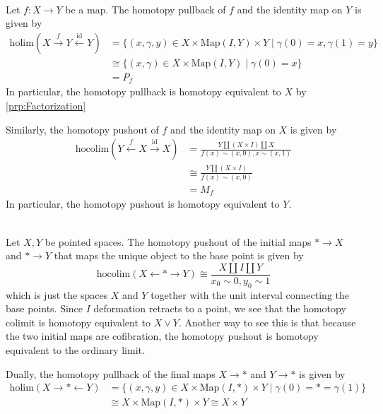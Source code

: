 \documentclass[a4paper]{article}
\begin{document}
\begin{eg}{}{}\\
Let $f:X\to Y$ be a map. The homotopy pullback of $f$ and the identity map on $Y$ is given by 
\begin{align*}
\text{holim}(X\overset{f}{\rightarrow}Y\overset{\text{id}}{\leftarrow}Y)&=\{(x,\gamma,y)\in X\times\text{Map}(I,Y)\times Y\;|\;\gamma(0)=x,\gamma(1)=y\}\\
&\cong\{(x,\gamma)\in X\times\text{Map}(I,Y)\;|\;\gamma(0)=x\}\\
&=P_f
\end{align*}
In particular, the homotopy pullback is homotopy equivalent to $X$ by \ref{prp:Factorization}

Similarly, the homotopy pushout of $f$ and the identity map on $X$ is given by \begin{align*}
\text{hocolim}(Y\overset{f}{\leftarrow}X\overset{\text{id}}{\rightarrow}X)&=\frac{Y\amalg(X\times I)\amalg X}{f(x)\sim(x,0), x\sim(x,1)}\\
&\cong\frac{Y\amalg(X\times I)}{f(x)\sim(x,0)}\\
&=M_f
\end{align*}
In particular, the homotopy pushout is homotopy equivalent to $Y$. 
\end{eg}

\begin{eg}{}{}\\
Let $X,Y$ be pointed spaces. The homotopy pushout of the initial maps $\ast\to X$ and $\ast\to Y$ that maps the unique object to the base point is given by $$\text{hocolim}(X\leftarrow\ast\rightarrow Y)\cong\frac{X\amalg I\amalg Y}{x_0\sim 0,y_0\sim 1}$$ which is just the spaces $X$ and $Y$ together with the unit interval connecting the base points. Since $I$ deformation retracts to a point, we see that the homotopy colimit is homotopy equivalent to $X\vee Y$. Another way to see this is that because the two initial maps are cofibration, the homotopy pushout is homotopy equivalent to the ordinary limit.  

Dually, the homotopy pullback of the final maps $X\to\ast$ and $Y\to\ast$ is given by 
\begin{align*}
\text{holim}(X\rightarrow\ast\leftarrow Y)&=\{(x,\gamma,y)\in X\times\text{Map}(I,\ast)\times Y\;|\;\gamma(0)=\ast=\gamma(1)\}\\
&\cong X\times\text{Map}(I,\ast)\times Y\cong X\times Y
\end{align*}
\end{eg}
\end{document}
